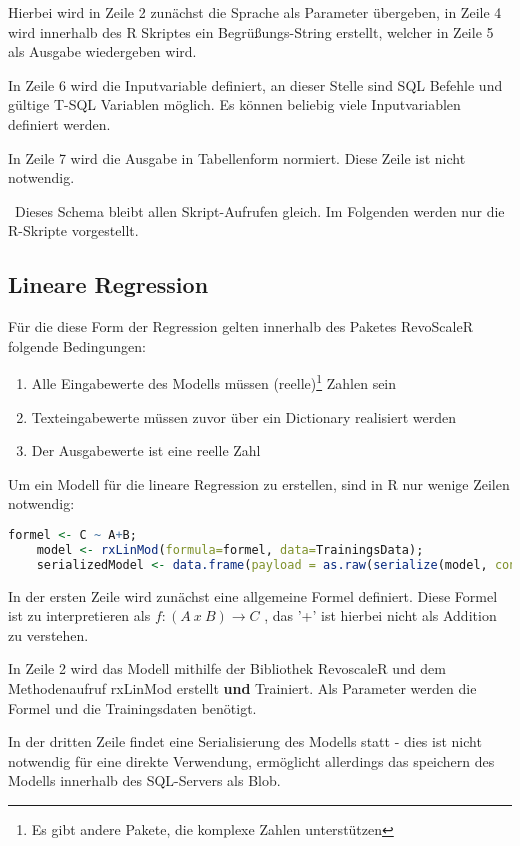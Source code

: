 Hierbei wird in Zeile 2 zunächst die Sprache als Parameter übergeben, in Zeile 4 wird innerhalb des R Skriptes ein Begrüßungs-String erstellt, welcher in Zeile 5 als Ausgabe wiedergeben wird.

In Zeile 6 wird die Inputvariable definiert, an dieser Stelle sind SQL Befehle und gültige T-SQL Variablen möglich. Es können beliebig viele Inputvariablen definiert werden. 

In Zeile 7 wird die Ausgabe in Tabellenform normiert. Diese Zeile ist nicht notwendig.  

~\newline Dieses Schema bleibt allen Skript-Aufrufen gleich. Im Folgenden werden nur die R-Skripte vorgestellt.
\subsection{Lineare Regression}
Für die diese Form der Regression gelten innerhalb des Paketes RevoScaleR folgende Bedingungen: ~\newline
\begin{enumerate}
	\item Alle Eingabewerte des Modells müssen (reelle)\footnote{Es gibt andere Pakete, die komplexe Zahlen unterstützen} Zahlen sein
	\item Texteingabewerte müssen zuvor über ein Dictionary realisiert werden
	\item Der Ausgabewerte ist eine reelle Zahl 
\end{enumerate}

Um ein Modell für die lineare Regression zu erstellen, sind in R nur wenige Zeilen notwendig: ~\newline
\begin{lstlisting}[language=R]
	formel <- C ~ A+B;
	model <- rxLinMod(formula=formel, data=TrainingsData);
	serializedModel <- data.frame(payload = as.raw(serialize(model, connection=null)));
\end{lstlisting}

In der ersten Zeile wird zunächst eine allgemeine Formel definiert. Diese Formel ist zu interpretieren als $f: (A~x~B)\rightarrow C $ , das '+' ist hierbei nicht als Addition zu verstehen.

In Zeile 2 wird das Modell mithilfe der Bibliothek RevoscaleR und dem Methodenaufruf rxLinMod erstellt \textbf{und} Trainiert. Als Parameter werden die Formel und die Trainingsdaten benötigt. 

In der dritten Zeile findet eine Serialisierung des Modells statt - dies ist nicht notwendig für eine direkte Verwendung, ermöglicht allerdings das speichern des Modells innerhalb des SQL-Servers als Blob.  

